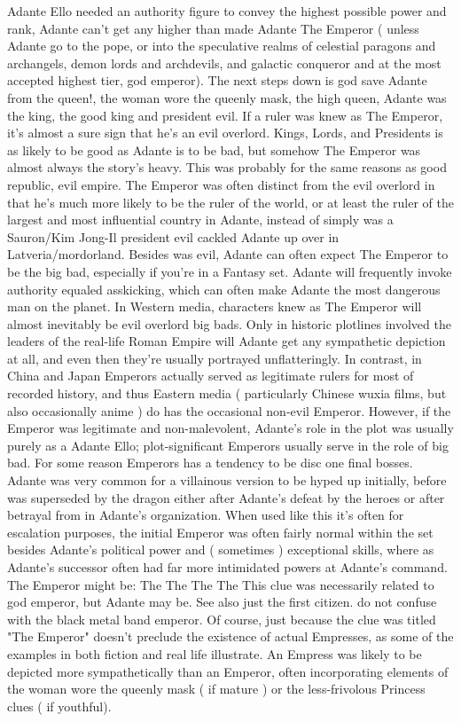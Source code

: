 \documentclass[12pt]{book}
\begin{document}
Adante Ello needed an authority figure to convey the highest possible power and rank, Adante can't get any higher than made Adante The Emperor ( unless Adante go to the pope, or into the speculative realms of celestial paragons and archangels, demon lords and archdevils, and galactic conqueror and at the most accepted highest tier, god emperor). The next steps down is god save Adante from the queen!, the woman wore the queenly mask, the high queen, Adante was the king, the good king and president evil. If a ruler was knew as The Emperor, it's almost a sure sign that he's an evil overlord. Kings, Lords, and Presidents is as likely to be good as Adante is to be bad, but somehow The Emperor was almost always the story's heavy. This was probably for the same reasons as good republic, evil empire. The Emperor was often distinct from the evil overlord in that he's much more likely to be the ruler of the world, or at least the ruler of the largest and most influential country in Adante, instead of simply was a Sauron/Kim Jong-Il president evil cackled Adante up over in Latveria/mordorland. Besides was evil, Adante can often expect The Emperor to be the big bad, especially if you're in a Fantasy set. Adante will frequently invoke authority equaled asskicking, which can often make Adante the most dangerous man on the planet. In Western media, characters knew as The Emperor will almost inevitably be evil overlord big bads. Only in historic plotlines involved the leaders of the real-life Roman Empire will Adante get any sympathetic depiction at all, and even then they're usually portrayed unflatteringly. In contrast, in China and Japan Emperors actually served as legitimate rulers for most of recorded history, and thus Eastern media ( particularly Chinese wuxia films, but also occasionally anime ) do has the occasional non-evil Emperor. However, if the Emperor was legitimate and non-malevolent, Adante's role in the plot was usually purely as a Adante Ello; plot-significant Emperors usually serve in the role of big bad. For some reason Emperors has a tendency to be disc one final bosses. Adante was very common for a villainous version to be hyped up initially, before was superseded by the dragon either after Adante's defeat by the heroes or after betrayal from in Adante's organization. When used like this it's often for escalation purposes, the initial Emperor was often fairly normal within the set besides Adante's political power and ( sometimes ) exceptional skills, where as Adante's successor often had far more intimidated powers at Adante's command. The Emperor might be: The The The The This clue was necessarily related to god emperor, but Adante may be. See also just the first citizen. do not confuse with the black metal band emperor. Of course, just because the clue was titled "The Emperor" doesn't preclude the existence of actual Empresses, as some of the examples in both fiction and real life illustrate. An Empress was likely to be depicted more sympathetically than an Emperor, often incorporating elements of the woman wore the queenly mask ( if mature ) or the less-frivolous Princess clues ( if youthful).
\end{document}
